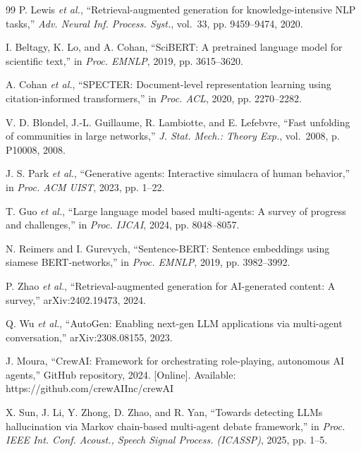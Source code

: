 \documentclass[conference]{IEEEtran}
\begin{document}
\begin{thebibliography}{99}
\fontsize{7.2pt}{8.2pt}\selectfont
\setlength{\itemsep}{0pt}
\setlength{\parsep}{0pt}
\setlength{\parskip}{0pt}
P. Lewis \emph{et al.}, ``Retrieval-augmented generation for
knowledge-intensive NLP tasks,'' \emph{Adv. Neural Inf. Process. Syst.},
vol.~33, pp. 9459--9474, 2020.

I. Beltagy, K. Lo, and A. Cohan, ``SciBERT: A pretrained language model for
scientific text,'' in \emph{Proc. EMNLP}, 2019, pp. 3615--3620.

A. Cohan \emph{et al.}, ``SPECTER: Document-level representation learning using
citation-informed transformers,'' in \emph{Proc. ACL}, 2020, pp. 2270--2282.

V. D. Blondel, J.-L. Guillaume, R. Lambiotte, and E. Lefebvre, ``Fast unfolding
of communities in large networks,'' \emph{J. Stat. Mech.: Theory Exp.},
vol.~2008, p. P10008, 2008.

J. S. Park \emph{et al.}, ``Generative agents: Interactive simulacra of human
behavior,'' in \emph{Proc. ACM UIST}, 2023, pp. 1--22.

T. Guo \emph{et al.}, ``Large language model based multi-agents: A survey of
progress and challenges,'' in \emph{Proc. IJCAI}, 2024, pp. 8048--8057.

N. Reimers and I. Gurevych, ``Sentence-BERT: Sentence embeddings using siamese
BERT-networks,'' in \emph{Proc. EMNLP}, 2019, pp. 3982--3992.

P. Zhao \emph{et al.}, ``Retrieval-augmented generation for AI-generated
content: A survey,'' arXiv:2402.19473, 2024.

Q. Wu \emph{et al.}, ``AutoGen: Enabling next-gen LLM applications via
multi-agent conversation,'' arXiv:2308.08155, 2023.

J. Moura, ``CrewAI: Framework for orchestrating role-playing, autonomous AI
agents,'' GitHub repository, 2024. [Online]. Available:
https://github.com/crewAIInc/crewAI

X. Sun, J. Li, Y. Zhong, D. Zhao, and R. Yan, ``Towards detecting LLMs
hallucination via Markov chain-based multi-agent debate framework,'' in
\emph{Proc. IEEE Int. Conf. Acoust., Speech Signal Process. (ICASSP)}, 2025,
pp. 1--5.


\end{thebibliography}
\end{document}
